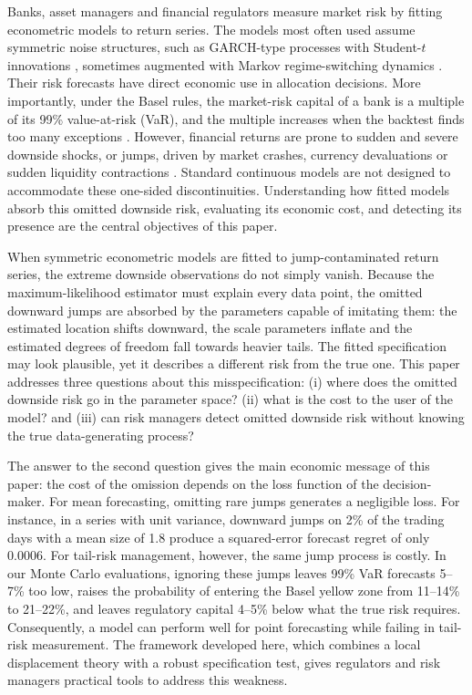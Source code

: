 \documentclass[11pt,a4paper]{article}
\theoremstyle{definition}
\theoremstyle{remark}
\begin{document}
Banks, asset managers and financial regulators measure market risk by fitting econometric models to return series. The models most often used assume symmetric noise structures, such as GARCH-type processes with Student-$t$ innovations \citep{bollerslev1986,ding1993,gjr1993}, sometimes augmented with Markov regime-switching dynamics \citep{hamilton1989,haas2004}. Their risk forecasts have direct economic use in allocation decisions. More importantly, under the Basel rules, the market-risk capital of a bank is a multiple of its 99\% value-at-risk (VaR), and the multiple increases when the backtest finds too many exceptions \citep{basel1996}. However, financial returns are prone to sudden and severe downside shocks, or jumps, driven by market crashes, currency devaluations or sudden liquidity contractions \citep{merton1976,eraker2003}. Standard continuous models are not designed to accommodate these one-sided discontinuities. Understanding how fitted models absorb this omitted downside risk, evaluating its economic cost, and detecting its presence are the central objectives of this paper.

When symmetric econometric models are fitted to jump-contaminated return series, the extreme downside observations do not simply vanish. Because the maximum-likelihood estimator must explain every data point, the omitted downward jumps are absorbed by the parameters capable of imitating them: the estimated location shifts downward, the scale parameters inflate and the estimated degrees of freedom fall towards heavier tails. The fitted specification may look plausible, yet it describes a different risk from the true one. This paper addresses three questions about this misspecification: (i) where does the omitted downside risk go in the parameter space? (ii) what is the cost to the user of the model? and (iii) can risk managers detect omitted downside risk without knowing the true data-generating process?

The answer to the second question gives the main economic message of this paper: the cost of the omission depends on the loss function of the decision-maker. For mean forecasting, omitting rare jumps generates a negligible loss. For instance, in a series with unit variance, downward jumps on 2\% of the trading days with a mean size of 1.8 produce a squared-error forecast regret of only $0.0006$. For tail-risk management, however, the same jump process is costly. In our Monte Carlo evaluations, ignoring these jumps leaves 99\% VaR forecasts 5--7\% too low, raises the probability of entering the Basel yellow zone from 11--14\% to 21--22\%, and leaves regulatory capital 4--5\% below what the true risk requires. Consequently, a model can perform well for point forecasting while failing in tail-risk measurement. The framework developed here, which combines a local displacement theory with a robust specification test, gives regulators and risk managers practical tools to address this weakness.
\end{document}
